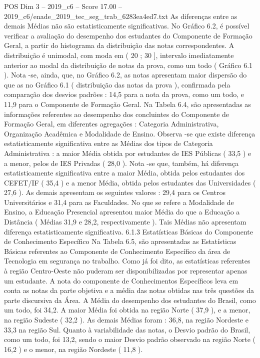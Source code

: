 \begin{textsample}{POS Dim 3 – 2019\_c6 – Score 17.00 – 2019\_c6/enade\_2019\_tec\_seg\_trab\_6283ea4ed7.txt}
As diferenças entre as demais Médias não são estatisticamente significativas.
No Gráfico 6.2, é possível verificar a avaliação do desempenho dos estudantes do Componente de Formação Geral, a partir do histograma da distribuição das notas correspondentes.
A distribuição é unimodal, com moda em ( 20 ; 30 ], intervalo imediatamente anterior ao modal da distribuição de notas da prova, como um todo ( Gráfico 6.1 ).
Nota -se, ainda, que, no Gráfico 6.2, as notas apresentam maior dispersão do que as no Gráfico 6.1 ( distribuição das notas da prova ), confirmada pela comparação dos desvios padrões : 14,5 para a nota da prova, como um todo, e 11,9 para o Componente de Formação Geral.
Na Tabela 6.4, são apresentadas as informações referentes ao desempenho dos concluintes do Componente de Formação Geral, em diferentes agregações : Categoria Administrativa, Organização Acadêmica e Modalidade de Ensino.
Observa -se que existe diferença estatisticamente significativa entre as Médias dos tipos de Categoria Administrativa : a maior Média obtida por estudantes de IES Públicas ( 33,5 ) e a menor, pelos de IES Privadas ( 28,0 ).
Nota -se que, também, há diferença estatisticamente significativa entre a maior Média, obtida pelos estudantes dos CEFET/IF ( 35,4 ) e a menor Média, obtida pelos estudantes das Universidades ( 27,6 ).
As demais apresentam os seguintes valores : 29,4 para os Centros Universitários e 31,4 para as Faculdades.
No que se refere a Modalidade de Ensino, a Educação Presencial apresentou maior Média do que a Educação a Distância ( Médias 31,9 e 28,2, respectivamente ).
Tais Médias não apresentam diferença estatisticamente significativa. 6.1.3 Estatísticas Básicas do Componente de Conhecimento Específico Na Tabela 6.5, são apresentadas as Estatísticas Básicas referentes ao Componente de Conhecimento Específico da área de Tecnologia em segurança no trabalho.
Como já foi dito, as estatísticas referentes à região Centro-Oeste não puderam ser disponibilizadas por representar apenas um estudante.
A nota do componente de Conhecimentos Específicos leva em conta as notas da parte objetiva e a média das notas obtidas nas três questões da parte discursiva da Área.
A Média do desempenho dos estudantes do Brasil, como um todo, foi 34,2.
A maior Média foi obtida na região Norte ( 37,9 ), e a menor, na região Sudeste ( 32,2 ).
As demais Médias foram : 36,8, na região Nordeste e 33,3 na região Sul.
Quanto à variabilidade das notas, o Desvio padrão do Brasil, como um todo, foi 13,2, sendo o maior Desvio padrão observado na região Norte ( 16,2 ) e o menor, na região Nordeste ( 11,8 ).

\end{textsample}
